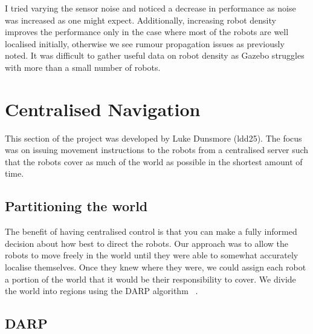 \documentclass[a4paper, 10pt, conference]{ieeeconf}      %
\begin{document}
I tried varying the sensor noise and noticed a decrease in performance as noise was increased as one might expect. Additionally, increasing robot density improves the performance only in the case where most of the robots are well localised initially, otherwise we see rumour propagation issues as previously noted. It was difficult to gather useful data on robot density as Gazebo struggles with more than a small number of robots.
\section{Centralised Navigation}
This section of the project was developed by Luke Dunsmore (ldd25). The focus was on issuing movement instructions to the robots from a centralised server such that the robots cover as much of the world as possible in the shortest amount of time.

\subsection{Partitioning the world}
The benefit of having centralised control is that you can make a fully informed decision about how best to direct the robots. Our approach was to allow the robots to move freely in the world until they were able to somewhat accurately localise themselves. Once they knew where they were, we could assign each robot a portion of the world that it would be their responsibility to cover. We divide the world into regions using the DARP algorithm ~\cite{darp}.

\subsection{DARP}
\label{section:darp}
\end{document}

